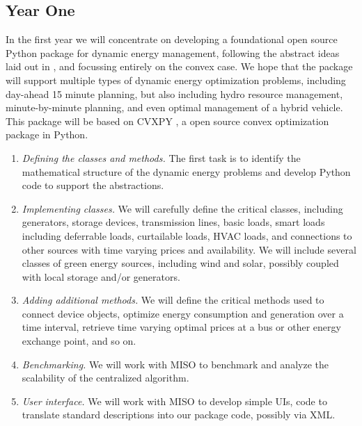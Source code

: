 \documentclass[12pt]{article}
\begin{document}
\subsection{Year One}
In the first year
we will concentrate on developing a foundational open source 
Python package for dynamic energy management,
following the abstract ideas laid out in 
\cite{kraning2014dynamic},
and focussing entirely on the convex case.
We hope that the package will support multiple types of 
dynamic energy optimization problems, including day-ahead 15 minute 
planning, but also including hydro resource management, minute-by-minute
planning, and even optimal management of a hybrid vehicle.
This package will be based on CVXPY 
\cite{cvxpy},
a open source convex optimization package in Python.
\begin{enumerate}
\item \emph{Defining the classes and methods.}  The first task is to 
identify the mathematical structure of the dynamic energy problems 
and develop Python code to support the abstractions.
\item \emph{Implementing classes.}
We will carefully define the critical classes,
including generators, storage devices, transmission lines,
basic loads, smart loads including deferrable loads, curtailable loads, 
HVAC loads, and connections to other sources with time varying prices 
and availability.
We will include several classes of green energy sources, 
including wind and solar,
possibly coupled with local storage and/or generators.
\item \emph{Adding additional methods.}
We will define the critical methods used to connect device objects,
optimize energy consumption and generation over a time interval,
retrieve time varying optimal prices at a bus or other 
energy exchange point, and so on.
\item \emph{Benchmarking.}
We will work with MISO to benchmark and analyze the scalability of the 
centralized algorithm.
\item \emph{User interface.} We will work with MISO to develop simple UIs,
code to translate standard descriptions into our package code, possibly
via XML.
\end{enumerate}
\end{document}
